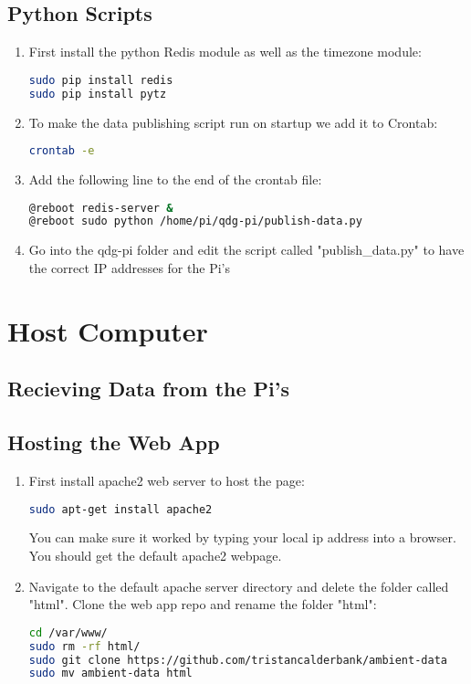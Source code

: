 \documentclass[a4paper,12pt]{article}
\begin{document}
\subsection{Python Scripts}

\begin{enumerate}
\item First install the python Redis module as well as the timezone module:
\begin{lstlisting}[language=bash]
sudo pip install redis
sudo pip install pytz
\end{lstlisting}
\item To make the data publishing script run on startup we add it to Crontab:
\begin{lstlisting}[language=bash]
crontab -e
\end{lstlisting}
\item Add the following line to the end of the crontab file:
\begin{lstlisting}[language=bash]
@reboot redis-server &
@reboot sudo python /home/pi/qdg-pi/publish-data.py
\end{lstlisting}

\item Go into the qdg-pi folder and edit the script called "publish\_data.py" to have the correct IP addresses for the Pi's


\end{enumerate}

\section{Host Computer}
\subsection{Recieving Data from the Pi's}

\subsection{Hosting the Web App}

\begin{enumerate}

\item First install apache2 web server to host the page:

\begin{lstlisting}[language=bash]
sudo apt-get install apache2
\end{lstlisting}

You can make sure it worked by typing your local ip address into a browser. You should get the default apache2 webpage.

\item Navigate to the default apache server directory and delete the folder called "html". Clone the web app repo and rename the folder "html":

\begin{lstlisting}[language=bash]
cd /var/www/
sudo rm -rf html/
sudo git clone https://github.com/tristancalderbank/ambient-data
sudo mv ambient-data html
\end{lstlisting}

\end{enumerate}
\end{document}
